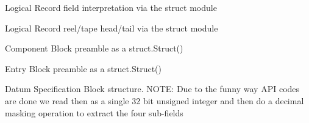 \documentclass[letterpaper,10pt,english]{sphinxmanual}
\begin{document}
\begin{fulllineitems}
\label{\detokenize{ref/LIS/core/LogiRec:TotalDepth.LIS.core.LogiRec.STRUCT_LR_FILE_HEAD_TAIL}}
Logical Record field interpretation via the struct module

\end{fulllineitems}


\begin{fulllineitems}
\label{\detokenize{ref/LIS/core/LogiRec:TotalDepth.LIS.core.LogiRec.STRUCT_LR_REEL_TAPE_HEAD_TAIL}}
Logical Record reel/tape head/tail via the struct module

\end{fulllineitems}


\begin{fulllineitems}
\label{\detokenize{ref/LIS/core/LogiRec:TotalDepth.LIS.core.LogiRec.STRUCT_COMPONENT_BLOCK_PREAMBLE}}
Component Block preamble as a struct.Struct()

\end{fulllineitems}


\begin{fulllineitems}
\label{\detokenize{ref/LIS/core/LogiRec:TotalDepth.LIS.core.LogiRec.STRUCT_ENTRY_BLOCK_PREAMBLE}}
Entry Block preamble as a struct.Struct()

\end{fulllineitems}


\begin{fulllineitems}
\label{\detokenize{ref/LIS/core/LogiRec:TotalDepth.LIS.core.LogiRec.STRUCT_DSB}}
Datum Specification Block structure.
NOTE: Due to the funny way API codes are done we read then as a single
32 bit unsigned integer and then do a decimal masking operation to
extract the four sub-fields

\end{fulllineitems}
\end{document}
